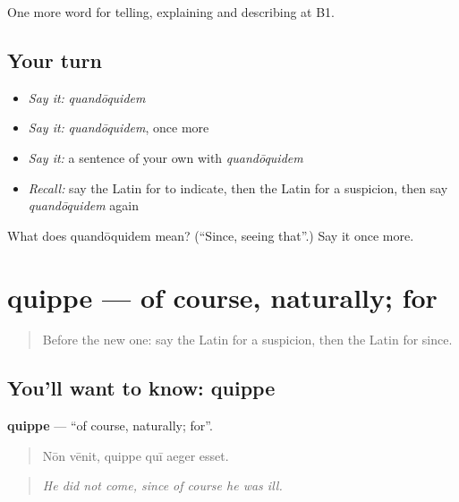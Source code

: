\begin{grammarlens}[title={What you've built}]
One more word for telling, explaining and describing at B1.
\end{grammarlens}

\subsection*{Your turn}
\begin{itemize}
\raggedright
  \item \emph{Say it:} \emph{quandōquidem}
  \item \emph{Say it:} \emph{quandōquidem}, once more
  \item \emph{Say it:} a sentence of your own with \emph{quandōquidem}
  \item \emph{Recall:} say the Latin for to indicate, then the Latin for a suspicion, then say \emph{quandōquidem} again
\end{itemize}

\begin{tcolorbox}[breakable,colback=teal!4,colframe=teal!35!black,title={Before you move on}]
What does quandōquidem mean? (\textquotedblleft{}Since, seeing that\textquotedblright{}.) Say it once more.
\end{tcolorbox}
\section[quippe]{quippe — of course, naturally; for}

\label{lesson:LA-C365-quippe}



\begin{quote}
Before the new one: say the Latin for a suspicion, then the Latin for since.
\end{quote}

\subsection*{You'll want to know: quippe}
\textbf{quippe} — \textquotedblleft{}of course, naturally; for\textquotedblright{}.

\begin{quote}
Nōn vēnit, quippe quī aeger esset.
\end{quote}

\begin{quote}
\emph{He did not come, since of course he was ill.}
\end{quote}


